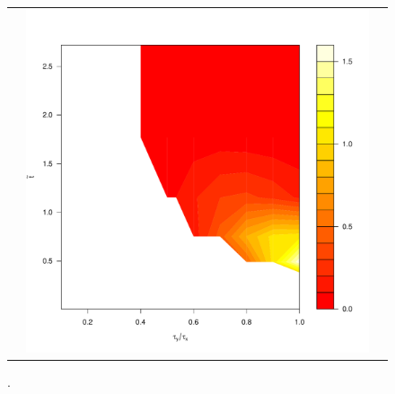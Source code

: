 \documentclass[10pt]{article}
\begin{document}
\begin{enumerate}
\begin{figure}
\begin{tabular}{ccc}
\begin{minipage}{0.33\textwidth}
    \end{minipage}
      & \begin{minipage}{0.33\textwidth}
      \includegraphics[width=1\linewidth]{small-sigma-Galerkin.pdf}
    \end{minipage}
  \end{tabular}
  \caption{.}
  \label{fig:small-sigma-sol}
 \end{figure}



\end{enumerate}
\end{document}
